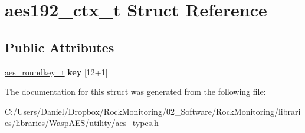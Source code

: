 \hypertarget{structaes192__ctx__t}{}\section{aes192\+\_\+ctx\+\_\+t Struct Reference}
\label{structaes192__ctx__t}
\subsection*{Public Attributes}
\begin{DoxyCompactItemize}
\item 
\hyperlink{structaes__roundkey__t}{aes\+\_\+roundkey\+\_\+t} {\bfseries key} \mbox{[}12+1\mbox{]}\hypertarget{structaes192__ctx__t_a8c14add3d59e2756b7d4cb0347759c0f}{}\label{structaes192__ctx__t_a8c14add3d59e2756b7d4cb0347759c0f}

\end{DoxyCompactItemize}


The documentation for this struct was generated from the following file\+:\begin{DoxyCompactItemize}
\item 
C\+:/\+Users/\+Daniel/\+Dropbox/\+Rock\+Monitoring/02\+\_\+\+Software/\+Rock\+Monitoring/libraries/libraries/\+Wasp\+A\+E\+S/utility/\hyperlink{aes__types_8h}{aes\+\_\+types.\+h}\end{DoxyCompactItemize}
